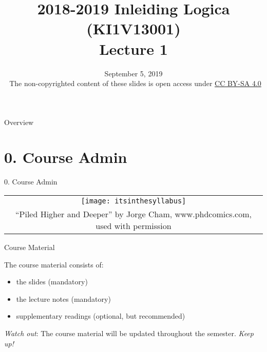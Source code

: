 \documentclass[../slides.tex]{subfiles}
\title{2018-2019 Inleiding Logica (KI1V13001) \\ Lecture 1}
\date{September 5, 2019\\[2ex] {\tiny \textcopyright~The non-copyrighted content of these slides is open access under \href{https://creativecommons.org/licenses/by-sa/4.0/}{CC BY-SA 4.0}}}
\begin{document}
\begin{frame}
	\maketitle
\end{frame}

\begin{frame}{Overview}
\tableofcontents[pausesections]
\end{frame}

\section{0. Course Admin}
\begin{frame}{0. Course Admin}

	\begin{center}
		\begin{tabular}{c}
		\texttt{[image: itsinthesyllabus]}\\
		{\tiny \textcopyright ``Piled Higher and Deeper'' by Jorge Cham,
www.phdcomics.com, used with permission}
		\end{tabular}
	\end{center}

\end{frame}

\begin{frame}{Course Material}

	The course material consists of:

	\begin{itemize}[<+->]
	
		\item the slides (mandatory)
		
		\item the lecture notes (mandatory)
		
		\item supplementary readings (optional, but recommended)
	
	\end{itemize}
	
	\emph{Watch out}: The course material will be updated throughout the semester. \emph{Keep up!}

\end{frame}
\end{document}
